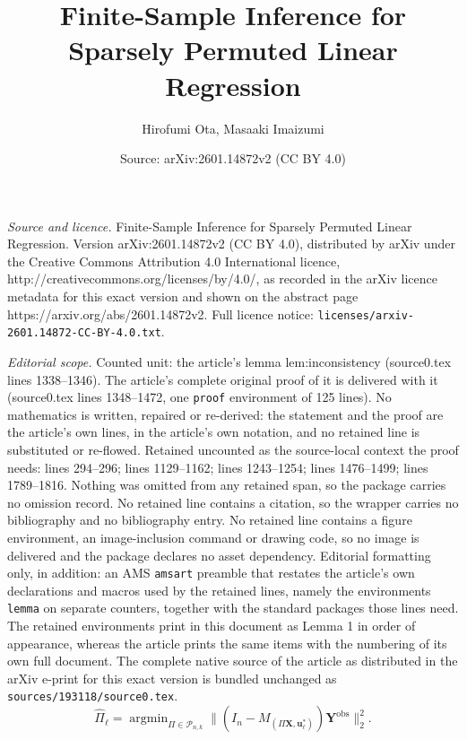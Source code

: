 \documentclass[10pt,a4paper]{amsart}
\title{Finite-Sample Inference for Sparsely Permuted Linear Regression}
\author{Hirofumi Ota, Masaaki Imaizumi}
\date{Source: arXiv:2601.14872v2 (CC BY 4.0)}
\DeclareMathOperator*{\argmin}{argmin}
\renewcommand{\hat}{\widehat}
\newcommand{\mP}{\mathcal{P}}
\newcommand{\obs}{\mathrm{obs}}
\begin{document}
\maketitle

\noindent\emph{Source and licence.} Finite-Sample Inference for Sparsely Permuted Linear Regression. Version arXiv:2601.14872v2 (CC BY 4.0), distributed by arXiv under the Creative Commons Attribution 4.0 International licence, http://creativecommons.org/licenses/by/4.0/, as recorded in the arXiv licence metadata for this exact version and shown on the abstract page https://arxiv.org/abs/2601.14872v2. Full licence notice: \texttt{licenses/arxiv-2601.14872-CC-BY-4.0.txt}.\par\smallskip

\noindent\textit{Editorial scope.} Counted unit: the article's lemma lem:inconsistency (source0.tex lines 1338--1346). The article's complete original proof of it is delivered with it (source0.tex lines 1348--1472, one \texttt{proof} environment of 125 lines). No mathematics is written, repaired or re-derived: the statement and the proof are the article's own lines, in the article's own notation, and no retained line is substituted or re-flowed.  Retained uncounted as the source-local context the proof needs: lines 294--296; lines 1129--1162; lines 1243--1254; lines 1476--1499; lines 1789--1816.  Nothing was omitted from any retained span, so the package carries no omission record.  No retained line contains a citation, so the wrapper carries no bibliography and no bibliography entry.  No retained line contains a figure environment, an image-inclusion command or drawing code, so no image is delivered and the package declares no asset dependency.  Editorial formatting only, in addition: an AMS \texttt{amsart} preamble that restates the article's own declarations and macros used by the retained lines, namely the environments \texttt{lemma} on separate counters, together with the standard packages those lines need.  The retained environments print in this document as Lemma 1 in order of appearance, whereas the article prints the same items with the numbering of its own full document.  The complete native source of the article as distributed in the arXiv e-print for this exact version is bundled unchanged as \texttt{sources/193118/source0.tex}.
\begin{equation}\label{eq:repro_Pi}
   \hat{\Pi}_{\ell} = \argmin_{\Pi \in \mP_{n,k}}\| (I_n - M_{(\Pi \bm{X}, \bm{u}_{\ell}^*)}) \bm{Y}^{\obs}\|_2^2.
\end{equation}
\end{document}

